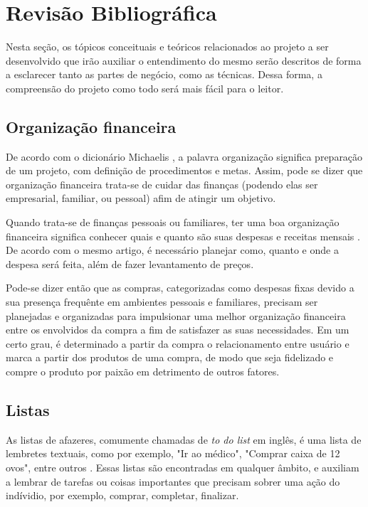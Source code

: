 \chapter{Revisão Bibliográfica}
Nesta seção, os tópicos conceituais e teóricos relacionados ao projeto a ser desenvolvido que irão auxiliar o entendimento do mesmo serão descritos de forma a esclarecer tanto as partes de negócio, como as técnicas. Dessa forma, a compreensão do projeto como todo será mais fácil para o leitor.

\section{Organização financeira}
De acordo com o dicionário Michaelis \cite{Michaelis}, a palavra organização significa preparação de um projeto, com definição de procedimentos e metas. Assim, pode se dizer que organização financeira trata-se de cuidar das finanças (podendo elas ser empresarial, familiar, ou pessoal) afim de atingir um objetivo.

Quando trata-se de finanças pessoais ou familiares, ter uma boa organização financeira significa conhecer quais e quanto são suas despesas e receitas mensais \cite{PlanejamentoFinanceiroFamiliar}. De acordo com o mesmo artigo, é necessário planejar como, quanto e onde a despesa será feita, além de fazer levantamento de preços.

Pode-se dizer então que as compras, categorizadas como despesas fixas devido a sua presença frequênte em ambientes pessoais e familiares, precisam ser planejadas e organizadas para impulsionar uma melhor organização financeira entre os envolvidos da compra a fim de satisfazer as suas necessidades. Em um certo grau, é determinado a partir da compra o relacionamento entre usuário e marca a partir dos produtos de uma compra, de modo que seja fidelizado e compre o produto por paixão em detrimento de outros fatores.

\section{Listas}
As listas de afazeres, comumente chamadas de \textit{to do list} em inglês, é uma lista de lembretes textuais, como por exemplo, "Ir ao médico", "Comprar caixa de 12 ovos", entre outros \cite{Towel}. Essas listas são encontradas em qualquer âmbito, e auxiliam a lembrar de tarefas ou coisas importantes que precisam sobrer uma ação do indívidio, por exemplo, comprar, completar, finalizar.

